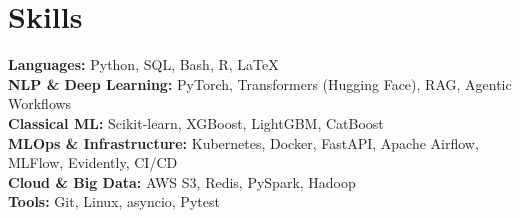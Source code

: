 \documentclass[letterpaper,11pt]{article}
\newcommand{\resumeSubHeadingListStart}{\begin{itemize}[leftmargin=0.15in, label={}]}
\newcommand{\resumeSubHeadingListEnd}{\end{itemize}}
\begin{document}
\section{Skills}
\vspace{3pt}
\resumeSubHeadingListStart
  \small{\item{
      \textbf{Languages:}{ Python, SQL, Bash, R, LaTeX} \\ \vspace*{3pt}
      \textbf{NLP \& Deep Learning:}{ PyTorch, Transformers (Hugging Face), RAG, Agentic Workflows} \\ \vspace*{3pt}
      \textbf{Classical ML:}{ Scikit-learn, XGBoost, LightGBM, CatBoost} \\ \vspace*{3pt}
      \textbf{MLOps \& Infrastructure:}{ Kubernetes, Docker, FastAPI, Apache Airflow, MLFlow, Evidently, CI/CD} \\ \vspace*{3pt}
      \textbf{Cloud \& Big Data:}{ AWS S3, Redis, PySpark, Hadoop} \\ \vspace*{3pt}
      \textbf{Tools:}{ Git, Linux, asyncio, Pytest} \\
  }}
\resumeSubHeadingListEnd
\end{document}
